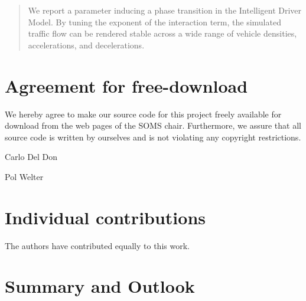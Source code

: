




\begin{abstract}
We report a parameter inducing a phase transition in the Intelligent Driver Model. By tuning the exponent of the interaction term, the simulated traffic flow can be rendered stable across a wide range of vehicle densities, accelerations, and decelerations.
\end{abstract}
\newpage


\newpage
\section*{Agreement for free-download}
\bigskip\bigskip
\large We hereby agree to make our source code for this project freely available for download from the web pages of the SOMS chair. Furthermore, we assure that all source code is written by ourselves and is not violating any copyright restrictions.

\begin{minipage}[t][2cm][b]{0.45\textwidth}
    \centering Carlo Del Don
\end{minipage}
\begin{minipage}[t][2cm][b]{0.45\textwidth}
    \centering Pol Welter
\end{minipage}

\vspace{5cm}
\section*{Individual contributions}
\bigskip\bigskip
The authors have contributed equally to this work.

\newpage

\tableofcontents

\newpage







\section{Summary and Outlook}




\cleardoublepage





  



 
